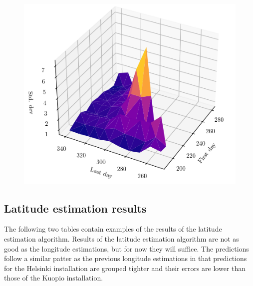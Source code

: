 



\begin{figure}[]
\centering
\includegraphics[width=0.5\linewidth]{pics/heatmap3d2}
\label{fig_heatmap3d2}
\end{figure}

\newpage

\subsection{Latitude estimation results}
The following two tables contain examples of the results of the latitude estimation algorithm. Results of the latitude estimation algorithm are not as good as the longitude estimations, but for now they will suffice. The predictions follow a similar patter as the previous longitude estimations in that predictions for the Helsinki installation are grouped tighter and their errors are lower than those of the Kuopio installation. 

